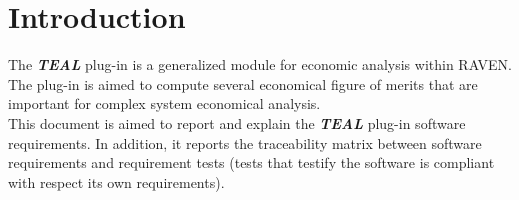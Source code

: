 \section{Introduction}
The \textbf{\textit{TEAL}} plug-in is a generalized module for economic analysis within RAVEN.
\\The plug-in is aimed to compute several economical figure of merits that are important for complex
system economical analysis.
\\This document is aimed to report and explain the  \textbf{\textit{TEAL}} plug-in software requirements. In addition, it reports the traceability matrix between software requirements and requirement tests (tests that testify the software is compliant
with respect its own requirements).

